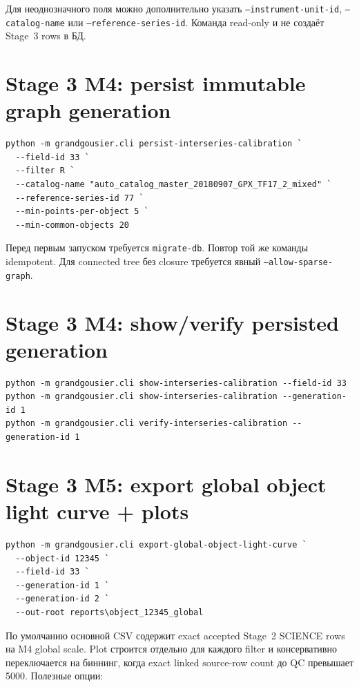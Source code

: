 Для неоднозначного поля можно дополнительно указать \texttt{--instrument-unit-id}, \texttt{--catalog-name} или \texttt{--reference-series-id}. Команда read-only и не создаёт Stage~3 rows в БД.

\section{Stage 3 M4: persist immutable graph generation}

\begin{lstlisting}
python -m grandgousier.cli persist-interseries-calibration `
  --field-id 33 `
  --filter R `
  --catalog-name "auto_catalog_master_20180907_GPX_TF17_2_mixed" `
  --reference-series-id 77 `
  --min-points-per-object 5 `
  --min-common-objects 20
\end{lstlisting}

Перед первым запуском требуется \texttt{migrate-db}. Повтор той же команды idempotent. Для connected tree без closure требуется явный \texttt{--allow-sparse-graph}.

\section{Stage 3 M4: show/verify persisted generation}

\begin{lstlisting}
python -m grandgousier.cli show-interseries-calibration --field-id 33
python -m grandgousier.cli show-interseries-calibration --generation-id 1
python -m grandgousier.cli verify-interseries-calibration --generation-id 1
\end{lstlisting}

\section{Stage 3 M5: export global object light curve + plots}

\begin{lstlisting}
python -m grandgousier.cli export-global-object-light-curve `
  --object-id 12345 `
  --field-id 33 `
  --generation-id 1 `
  --generation-id 2 `
  --out-root reports\object_12345_global
\end{lstlisting}

По умолчанию основной CSV содержит exact accepted Stage~2 SCIENCE rows на M4 global scale. Plot строится отдельно для каждого filter и консервативно переключается на биннинг, когда exact linked source-row count до QC превышает 5000. Полезные опции:

